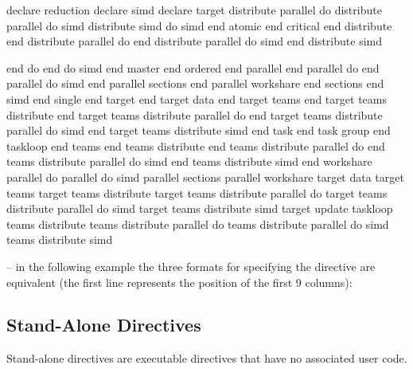 \begin{indentedcodelist}
declare reduction
declare simd
declare target
distribute parallel do
distribute parallel do simd
distribute simd
do simd
end atomic
end critical
end distribute 
end distribute parallel do
end distribute parallel do simd
end distribute simd
\end{indentedcodelist}
\pagebreak
\begin{figure}[t!]
\end{figure}
\begin{indentedcodelist}
end do
end do simd
end master
end ordered
end parallel
end parallel do
end parallel do simd
end parallel sections
end parallel workshare
end sections
end simd
end single
end target
end target data
end target teams
end target teams distribute
end target teams distribute parallel do
end target teams distribute parallel do simd
end target teams distribute simd
end task
end task group
end taskloop
end teams
end teams distribute
end teams distribute parallel do
end teams distribute parallel do simd
end teams distribute simd
end workshare
parallel do
parallel do simd
parallel sections
parallel workshare
target data
target teams
target teams distribute
target teams distribute parallel do
target teams distribute parallel do simd
target teams distribute simd
target update
taskloop
teams distribute
teams distribute parallel do
teams distribute parallel do simd
teams distribute simd
\end{indentedcodelist}

\notestart
\noteheader – in the following example the three formats for specifying the directive are 
equivalent (the first line represents the position of the first 9 columns):

\begin{alltt}
\end{alltt}
\noteend
\bigskip
\fortranspecificend








\subsection{Stand-Alone Directives}
\label{subsec:Stand-Alone Directives}
\summary
Stand-alone directives are executable directives that have no associated user code.

